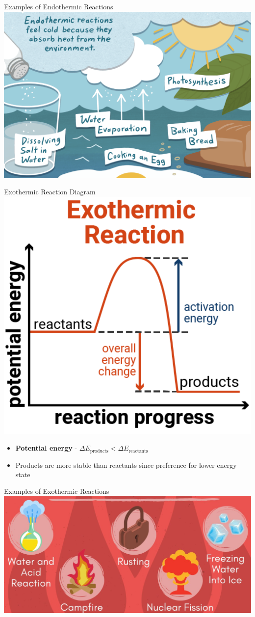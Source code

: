 \documentclass[11pt]{beamer}
\begin{document}
\begin{frame}{Examples of Endothermic Reactions}
  \centering
  \includegraphics[width=\linewidth]{endo_everyday}
\end{frame}

\begin{frame}{Exothermic Reaction Diagram}
  \centering
  \includegraphics[width=0.5\linewidth]{exo_rxn}
  \begin{itemize}
  \item \textbf{Potential energy} - $\Delta E_\text{products} < \Delta E_\text{reactants}$
  \item Products are more stable than reactants since preference
    for lower energy state
  \end{itemize}
\end{frame}

\begin{frame}{Examples of Exothermic Reactions}
  \centering
  \includegraphics[width=\linewidth]{exo_everyday}
\end{frame}
\end{document}
